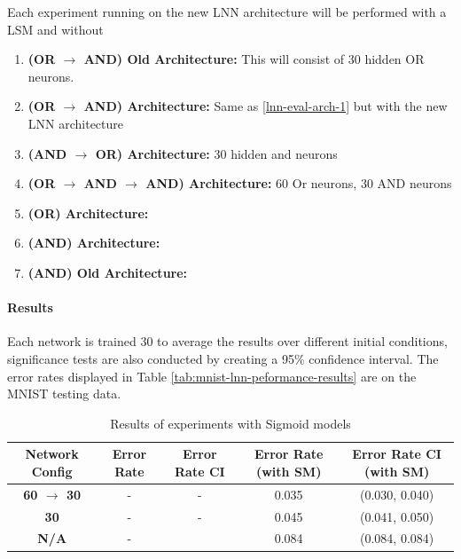 Each experiment running on the new LNN architecture will be performed with a LSM and without

\begin{enumerate}
	\item \textbf{(OR $\rightarrow$ AND) Old Architecture:} This will consist of 30 hidden OR neurons. \label{lnn-eval-arch-1}
	\item \textbf{(OR $\rightarrow$ AND) Architecture:} Same as \ref{lnn-eval-arch-1} but with the new LNN architecture \label{lnn-eval-arch-2}
	\item \textbf{(AND $\rightarrow$ OR) Architecture:} 30 hidden and neurons \label{lnn-eval-arch-3}
	\item \textbf{(OR $\rightarrow$ AND $\rightarrow$ AND) Architecture: } 60 Or neurons, 30 AND neurons\label{lnn-eval-arch-4}
	\item \textbf{(OR) Architecture:} \label{lnn-eval-arch-5}
	\item \textbf{(AND) Architecture:} \label{lnn-eval-arch-6}
	\item \textbf{(AND) Old Architecture:} \label{lnn-eval-arch-7}
\end{enumerate}

\paragraph{Results}
Each network is trained 30 to average the results over different initial conditions, significance tests are also conducted by creating a 95\% confidence interval. The error rates displayed in Table \ref{tab:mnist-lnn-peformance-results} are on the MNIST testing data.


\begin{table}[H]
	\begin{center}
		\begin{tabular}{| c | c | c | c | c |}
			\hline
			\textbf{Network Config} & \textbf{Error Rate} & \textbf{Error Rate CI} & \textbf{Error Rate (with SM)} & \textbf{Error Rate CI (with SM)}\\
			\hline
			\hline
			\textbf{60 $\rightarrow$ 30} & - & - & 0.035 & (0.030, 0.040)\\
			\textbf{30} & - & - & 0.045 & (0.041, 0.050)\\
			\textbf{N/A} & - &  & 0.084 & (0.084, 0.084)\\
			\hline
		\end{tabular}
	\end{center}
	\caption{Results of experiments with Sigmoid models}
	\label{tab:mnist-sigmoid-peformance-results}
\end{table}


